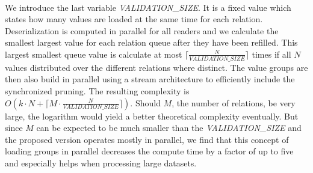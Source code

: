 \noindent \\ We introduce the last variable \textit{VALIDATION\_SIZE}. It is a fixed value which states how many values are loaded at the same time for each relation. Deserialization is computed in parallel for all readers and we calculate the smallest largest value for each relation queue after they have been refilled. This largest smallest queue value is calculate at most $\lceil\frac{N}{\textit{VALIDATION\_SIZE}}\rceil$ times if all $N$ values distributed over the different relations where distinct. The value groups are then also build in parallel using a stream architecture to efficiently include the synchronized pruning. The resulting complexity is  $O(k \cdot N + \lceil M \cdot \frac{N}{\textit{VALIDATION\_SIZE}}\rceil)$. Should $M$, the number of relations, be very large, the logarithm would yield a better theoretical complexity eventually. But since $M$ can be expected to be much smaller than the \textit{VALIDATION\_SIZE} and the proposed version operates mostly in parallel, we find that this concept of loading groups in parallel decreases the compute time by a factor of up to five and especially helps when processing large datasets.

